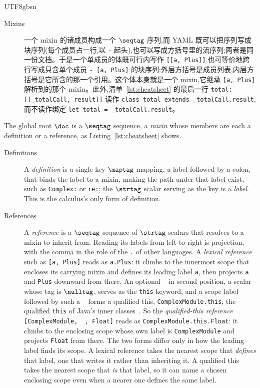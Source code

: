\begin{CJK*}{UTF8}{gbsn}
\begin{description}
  \item[Mixins]
    一个 mixin 的诸成员构成一个 $\seqtag$ 序列,而 YAML 既可以把序列写成块序列(每个成员占一行,以 \texttt{-} 起头),也可以写成方括号里的流序列;两者是同一份文档。于是一个单成员的体既可行内写作 \texttt{[[a, Plus]]},也可等价地跨行写成只含单个成员 \texttt{- [a, Plus]} 的块序列:外层方括号是成员列表,内层方括号是它所含的那一个引用。这个体本身就是一个 mixin,它继承 \texttt{[a, Plus]} 解析到的那个 mixin。此外,清单~\ref{lst:cheatsheet} 的最后一行 \texttt{total: [[_totalCall, result]]} 读作 \texttt{class total extends _totalCall.result},而不读作绑定 \texttt{let total = _totalCall.result}。
\end{description}
\else
The global root $\doc$ is a $\seqtag$ sequence, a \emph{mixin} whose members are each a definition or a reference, as Listing~\ref{lst:cheatsheet} shows.
\begin{description}
  \item[Definitions]
    A \emph{definition} is a single-key $\maptag$ mapping, a label followed by a colon, that binds the label to a mixin, making the path under that label exist, such as \texttt{Complex:} or \texttt{re:}; the $\strtag$ scalar serving as the key is a \emph{label}. This is the calculus's only form of definition.

  \item[References]
    A \emph{reference} is a $\seqtag$ sequence of $\strtag$ scalars that resolves to a mixin to inherit from. Reading its labels from left to right is projection, with the comma in the role of the \texttt{.} of other languages. A \emph{lexical reference} such as \texttt{[a, Plus]} reads as \texttt{a.Plus}: it climbs to the innermost scope that encloses its carrying mixin and defines its leading label \texttt{a}, then projects \texttt{a} and \texttt{Plus} downward from there. An optional \texttt{~} in second position, a scalar whose tag is $\nulltag$, serves as the \texttt{this} keyword, and a scope label followed by such a \texttt{~} forms a qualified this, \texttt{ComplexModule.this}, the qualified \texttt{this} of Java's inner classes~\cite{gosling2000-java-language-specification}. So the \emph{qualified-this reference} \texttt{[ComplexModule, ~, Float]} reads as \texttt{ComplexModule.this.Float}: it climbs to the enclosing scope whose own label is \texttt{ComplexModule} and projects \texttt{Float} from there. The two forms differ only in how the leading label finds its scope. A lexical reference takes the nearest scope that \emph{defines} that label, one that writes it rather than inheriting it. A qualified this takes the nearest scope that \emph{is} that label, so it can name a chosen enclosing scope even when a nearer one defines the same label.


\end{description}
\end{CJK*}
